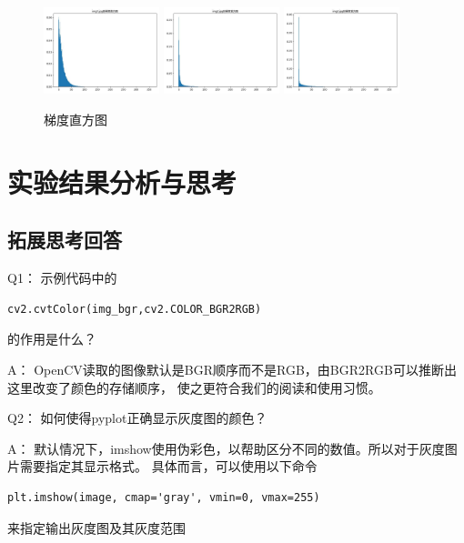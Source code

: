 \documentclass{article}
\begin{document}
\begin{figure}[h]
    \centering
    \includegraphics[width=0.3\textwidth]{./gradmap/img1}
    \includegraphics[width=0.3\textwidth]{./gradmap/img2}
    \includegraphics[width=0.3\textwidth]{./gradmap/img3}
    \caption{梯度直方图}
\end{figure}

\section{实验结果分析与思考}
\subsection{拓展思考回答}
    Q1： 示例代码中的
\begin{lstlisting}
cv2.cvtColor(img_bgr,cv2.COLOR_BGR2RGB)
\end{lstlisting}
    的作用是什么？

    A： OpenCV读取的图像默认是BGR顺序而不是RGB，由BGR2RGB可以推断出这里改变了颜色的存储顺序，
    使之更符合我们的阅读和使用习惯。

    Q2： 如何使得pyplot正确显示灰度图的颜色？

    A： 默认情况下，imshow使用伪彩色，以帮助区分不同的数值。所以对于灰度图片需要指定其显示格式。
    具体而言，可以使用以下命令

    \begin{lstlisting}
plt.imshow(image, cmap='gray', vmin=0, vmax=255)
    \end{lstlisting}
来指定输出灰度图及其灰度范围
    
\end{document}
